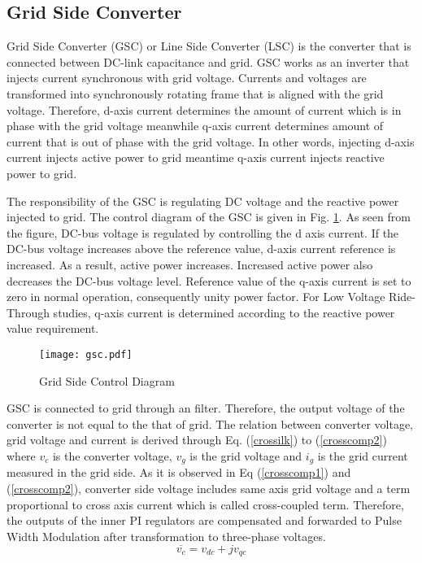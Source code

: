 \subsection{Grid Side Converter}
Grid Side Converter (GSC) or Line Side Converter (LSC) is the converter that is connected between DC-link capacitance and grid. GSC works as an inverter that injects current synchronous with grid voltage. Currents and voltages are transformed into synchronously rotating frame that is aligned with the grid voltage. Therefore, d-axis current determines the amount of current which is in phase with the grid voltage meanwhile q-axis current determines amount of current that is out of phase with the grid voltage. In other words, injecting d-axis current injects active power to grid meantime q-axis current injects reactive power to grid. \par
The responsibility of the GSC is regulating DC voltage and the reactive power injected to grid. The control diagram of the GSC is given in Fig. \ref{gsc}. As seen from the figure, DC-bus voltage is regulated by controlling the d axis current. If the DC-bus voltage increases above the reference value, d-axis current reference is increased. As a result, active power increases. Increased active power also decreases the DC-bus voltage level. Reference value of the q-axis current is set to zero in normal operation, consequently unity power factor. For Low Voltage Ride-Through studies, q-axis current is determined according to the reactive power value requirement. \cite{Orowska-Kowalska2014} \par
\begin{figure}[h!]
	\centering
	\texttt{[image: gsc.pdf]}
	\caption{Grid Side Control Diagram}
	\label{gsc}
\end{figure}
GSC is connected to grid through an filter. Therefore, the output voltage of the converter is not equal to the that of grid. The relation between converter voltage, grid voltage and current is derived through Eq. (\ref{crossilk}) to (\ref{crosscomp2}) where $v_{c}$ is the converter voltage, $v_{g}$ is the grid voltage and  $i_{g}$ is the grid current measured in the grid side. As it is observed in Eq (\ref{crosscomp1}) and (\ref{crosscomp2}), converter side voltage includes same axis grid voltage and a term proportional to cross axis current which is called cross-coupled term. Therefore, the outputs of the inner PI regulators are compensated and forwarded to Pulse Width Modulation after transformation to three-phase voltages.
\begin{equation}
\overline{v_{c}}=v_{dc}+jv_{qc}
\label{crossilk}
\end{equation}
